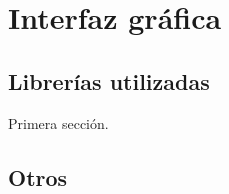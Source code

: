 \chapter{Interfaz gráfica}
\label{cha:gui}

\section{Librerías utilizadas}
Primera sección.

\section{Otros}